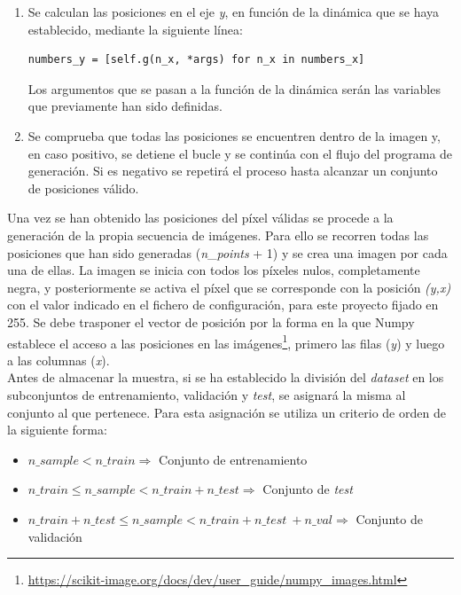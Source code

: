 \begin{enumerate}
  \item Se calculan las posiciones en el eje \textit{y}, en función de la dinámica que se haya establecido, mediante la siguiente línea:
  \vspace{10pt}
  \begin{lstlisting}[frame=single]
  numbers_y = [self.g(n_x, *args) for n_x in numbers_x]
  \end{lstlisting}
  Los argumentos que se pasan a la función de la dinámica serán las variables que previamente han sido definidas.
  
  \item Se comprueba que todas las posiciones se encuentren dentro de la imagen y, en caso positivo, se detiene el bucle y se continúa con el flujo del programa de generación. Si es negativo se repetirá el proceso hasta alcanzar un conjunto de posiciones válido.
\end{enumerate}

Una vez se han obtenido las posiciones del píxel válidas se procede a la generación de la propia secuencia de imágenes. Para ello se recorren todas las posiciones que han sido generadas (\textit{n}\_\textit{points} + 1) y se crea una imagen por cada una de ellas. La imagen se inicia con todos los píxeles nulos, completamente negra, y posteriormente se activa el píxel que se corresponde con la posición \textit{(y,x)} con el valor indicado en el fichero de configuración, para este proyecto fijado en 255. Se debe trasponer el vector de posición por la forma en la que Numpy establece el acceso a las posiciones en las imágenes\footnote{\url{https://scikit-image.org/docs/dev/user\_guide/numpy_images.html}}, primero las filas (\textit{y}) y luego a las columnas (\textit{x}).\\

Antes de almacenar la muestra, si se ha establecido la división del \textit{dataset} en los subconjuntos de entrenamiento, validación y \textit{test}, se asignará la misma al conjunto al que pertenece. Para esta asignación se utiliza un criterio de orden de la siguiente forma:

\begin{itemize}
    \setlength\itemsep{3pt}
    \item $n\_sample < n\_train \Rightarrow$ Conjunto de entrenamiento
    \item $n\_train \leqslant n\_sample < n\_train + n\_test\Rightarrow$ Conjunto de \textit{test}
    \item $n\_train + n\_test \leqslant n\_sample < n\_train + n\_test\ + n\_val \Rightarrow$ Conjunto de validación
\end{itemize}

